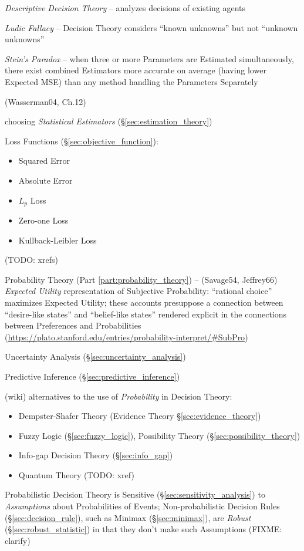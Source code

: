 \emph{Descriptive Decision Theory} -- analyzes decisions of existing agents

\emph{Ludic Fallacy} -- Decision Theory considers ``known unknowns'' but not
``unknown unknowns''

\emph{Stein's Paradox} -- when three or more Parameters are Estimated
simultaneously, there exist combined Estimators more accurate on average (having
lower Expected MSE) than any method handling the Parameters Separately

(Wasserman04, Ch.12)

choosing \emph{Statistical Estimators} (\S\ref{sec:estimation_theory})

Loss Functions (\S\ref{sec:objective_function}):
\begin{itemize}
  \item Squared Error
  \item Absolute Error
  \item $L_p$ Loss
  \item Zero-one Loss
  \item Kullback-Leibler Loss
\end{itemize}
(TODO: xrefs)

\fist Probability Theory (Part \ref{part:probability_theory}) -- (Savage54,
Jeffrey66) \emph{Expected Utility} representation of Subjective Probability:
``rational choice'' maximizes Expected Utility; these accounts presuppose a
connection between ``desire-like states'' and ``belief-like states'' rendered
explicit in the connections between Preferences and Probabilities
(\url{https://plato.stanford.edu/entries/probability-interpret/#SubPro})

\fist Uncertainty Analysis (\S\ref{sec:uncertainty_analysis})

\fist Predictive Inference (\S\ref{sec:predictive_inference})

(wiki) alternatives to the use of \emph{Probability} in Decision Theory:
\begin{itemize}
  \item Dempster-Shafer Theory (Evidence Theory \S\ref{sec:evidence_theory})
  \item Fuzzy Logic (\S\ref{sec:fuzzy_logic}), Possibility Theory
    (\S\ref{sec:possibility_theory})
  \item Info-gap Decision Theory (\S\ref{sec:info_gap})
  \item Quantum Theory (TODO: xref)
\end{itemize}
Probabilistic Decision Theory is Sensitive (\S\ref{sec:sensitivity_analysis}) to
\emph{Assumptions} about Probabilities of Events; Non-probabilistic Decision
Rules (\S\ref{sec:decision_rule}), such as Minimax (\S\ref{sec:minimax}), are
\emph{Robust} (\S\ref{sec:robust_statistic}) in that they don't make such
Assumptions (FIXME: clarify)



